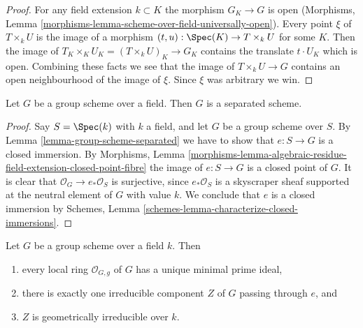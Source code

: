 \begin{proof}
For any field extension $k \subset K$ the morphism $G_K \to G$ is open
(Morphisms, Lemma \ref{morphisms-lemma-scheme-over-field-universally-open}).
Every point $\xi$ of $T \times_k U$ is the image of a morphism
$(t, u) : \Spec(K) \to T \times_k U$ for some $K$. Then the image of
$T_K \times_K U_K = (T \times_k U)_K \to G_K$ contains the translate
$t \cdot U_K$ which is open. Combining these facts we see that the
image of $T \times_k U \to G$ contains an open neighbourhood of
the image of $\xi$. Since $\xi$ was arbitrary we win.
\end{proof}

\begin{lemma}
\label{lemma-group-scheme-over-field-separated}
Let $G$ be a group scheme over a field.
Then $G$ is a separated scheme.
\end{lemma}

\begin{proof}
Say $S = \Spec(k)$ with $k$ a field, and let $G$ be a group scheme
over $S$. By
Lemma \ref{lemma-group-scheme-separated}
we have to show that $e : S \to G$ is a closed immersion. By
Morphisms, Lemma
\ref{morphisms-lemma-algebraic-residue-field-extension-closed-point-fibre}
the image of $e : S \to G$ is a closed point of $G$.
It is clear that $\mathcal{O}_G \to e_*\mathcal{O}_S$ is surjective,
since $e_*\mathcal{O}_S$ is a skyscraper sheaf supported at the neutral
element of $G$ with value $k$. We conclude that $e$ is a closed immersion by
Schemes, Lemma \ref{schemes-lemma-characterize-closed-immersions}.
\end{proof}

\begin{lemma}
\label{lemma-group-scheme-field-geometrically-irreducible}
Let $G$ be a group scheme over a field $k$.
Then
\begin{enumerate}
\item every local ring $\mathcal{O}_{G, g}$ of $G$ has a unique
minimal prime ideal,
\item there is exactly one irreducible component $Z$ of $G$
passing through $e$, and
\item $Z$ is geometrically irreducible over $k$.
\end{enumerate}
\end{lemma}

